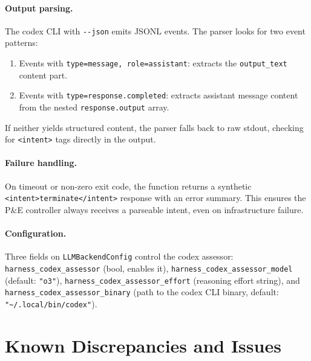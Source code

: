 \documentclass[11pt,letterpaper]{report}
\newcommand{\code}[1]{\texttt{#1}}
\begin{document}
\paragraph{Output parsing.}
The codex CLI with \code{-{}-json} emits JSONL events. The parser looks
for two event patterns:
\begin{enumerate}[nosep]
  \item Events with \code{type=message, role=assistant}: extracts the
        \code{output\_text} content part.
  \item Events with \code{type=response.completed}: extracts assistant
        message content from the nested \code{response.output} array.
\end{enumerate}
If neither yields structured content, the parser falls back to raw
stdout, checking for \code{<intent>} tags directly in the output.

\paragraph{Failure handling.}
On timeout or non-zero exit code, the function returns a synthetic
\code{<intent>terminate</intent>} response with an error summary. This
ensures the P\&E controller always receives a parseable intent, even on
infrastructure failure.

\paragraph{Configuration.}
Three fields on \code{LLMBackendConfig} control the codex assessor:
\code{harness\_codex\_assessor} (bool, enables it),
\code{harness\_codex\_assessor\_model} (default: \code{"o3"}),
\code{harness\_codex\_assessor\_effort} (reasoning effort string), and
\code{harness\_codex\_assessor\_binary} (path to the codex CLI binary,
default: \code{"\textasciitilde/.local/bin/codex"}).


\section{Known Discrepancies and Issues}
\label{sec:issues}
\end{document}
